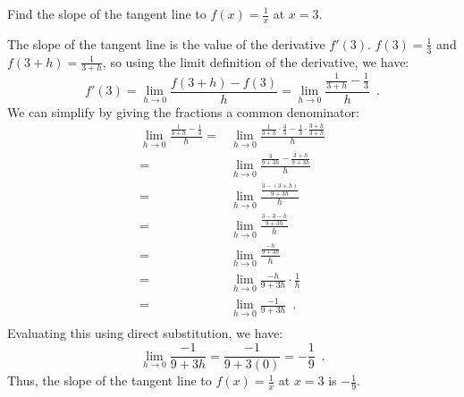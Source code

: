 \begin{example}
Find the slope of the tangent line to $f(x)=\frac{1}{x}$ at $x=3$.

\begin{solution} The slope of the tangent line is the value of the derivative $f'(3)$. $f(3)=\frac{1}{3}$ and $f(3+h)=\frac{1}{3+h}$, so using the limit definition of the derivative, we have:
$$f'(3)=\lim_{h\to 0}\frac{f(3+h)-f(3)}{h}=\lim_{h\to 0}\frac{\frac{1}{3+h}-\frac{1}{3}}{h} \enspace .$$
We can simplify by giving the fractions a common denominator:
\begin{align*}
		\lim_{h\to 0}\frac{\frac{1}{3+h}-\frac{1}{3}}{h}=& \lim_{h\to 0}\frac{\frac{1}{3+h}\cdot\frac{3}{3}-\frac{1}{3}\cdot\frac{3+h}{3+h}}{h} \\
		=& \lim_{h\to 0}\frac{\frac{3}{9+3h}-\frac{3+h}{9+3h}}{h} \\
		=& \lim_{h\to 0}\frac{\frac{3-(3+h)}{9+3h}}{h} \\
		=& \lim_{h\to 0}\frac{\frac{3-3-h}{9+3h}}{h} \\
		=& \lim_{h\to 0}\frac{\frac{-h}{9+3h}}{h} \\
		=& \lim_{h\to 0}\frac{-h}{9+3h}\cdot\frac{1}{h} \\
		=& \lim_{h\to 0}\frac{-1}{9+3h} \enspace .\\
	\end{align*}
Evaluating this using direct substitution, we have:
$$\lim_{h\to 0}\frac{-1}{9+3h}=\frac{-1}{9+3(0)}=-\frac{1}{9} \enspace.$$
Thus, the slope of the tangent line to $f(x)=\frac{1}{x}$ at $x=3$ is $-\frac{1}{9}$.
\end{solution}\end{example}

